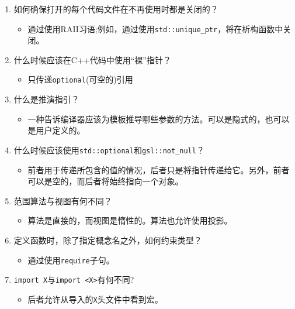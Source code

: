 \begin{enumerate}
\item
如何确保打开的每个代码文件在不再使用时都是关闭的？
\begin{itemize}
\item 
通过使用RAII习语;例如，通过使用\texttt{std::unique\_ptr}，将在析构函数中关闭。
\end{itemize}

\item 
什么时候应该在C++代码中使用“裸”指针？
\begin{itemize}
\item 
只传递\texttt{optional}(可空的)引用
\end{itemize}

\item 
什么是推演指引？
\begin{itemize}
\item 
一种告诉编译器应该为模板推导哪些参数的方法。可以是隐式的，也可以是用户定义的。
\end{itemize}

\item 
什么时候应该使用\texttt{std::optional}和\texttt{gsl::not\_null}？
\begin{itemize}
\item 
前者用于传递所包含的值的情况，后者只是将指针传递给它。另外，前者可以是空的，而后者将始终指向一个对象。
\end{itemize}

\item 
范围算法与视图有何不同？
\begin{itemize}
\item 
算法是直接的，而视图是惰性的。算法也允许使用投影。
\end{itemize}

\item 
定义函数时，除了指定概念名之外，如何约束类型？
\begin{itemize}
\item 
通过使用\texttt{require}子句。
\end{itemize}

\item 
\texttt{import X}与\texttt{import <X>}有何不同?
\begin{itemize}
\item 
后者允许从导入的\texttt{X}头文件中看到宏。
\end{itemize}
\end{enumerate}